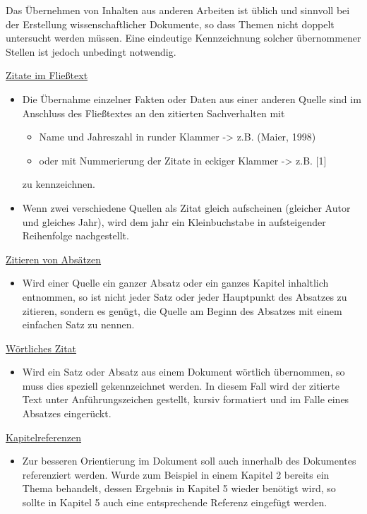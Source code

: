 Das Übernehmen von Inhalten aus anderen Arbeiten ist üblich und sinnvoll bei der Erstellung wissenschaftlicher Dokumente, so dass Themen nicht doppelt untersucht werden müssen. Eine eindeutige Kennzeichnung solcher übernommener Stellen ist jedoch unbedingt notwendig.

\underline{Zitate im Fließtext}
\begin{itemize}
    \item Die Übernahme einzelner Fakten oder Daten aus einer anderen Quelle sind im Anschluss des Fließtextes an den zitierten Sachverhalten mit
    \begin{itemize}
        \item Name und Jahreszahl in runder Klammer -> z.B. (Maier, 1998)
        \item oder mit Nummerierung der Zitate in eckiger Klammer -> z.B. [1]
    \end{itemize}
    zu kennzeichnen.
    \item Wenn zwei verschiedene Quellen als Zitat gleich aufscheinen (gleicher Autor und gleiches Jahr), wird dem jahr ein Kleinbuchstabe in aufsteigender Reihenfolge nachgestellt.
\end{itemize}


\underline{Zitieren von Absätzen}
\begin{itemize}
    \item Wird einer Quelle ein ganzer Absatz oder ein ganzes Kapitel inhaltlich entnommen, so ist nicht jeder Satz oder jeder Hauptpunkt des Absatzes zu zitieren, sondern es genügt, die Quelle am Beginn des Absatzes mit einem einfachen Satz zu nennen.
\end{itemize}


\underline{Wörtliches Zitat}
\begin{itemize}
    \item Wird ein Satz oder Absatz aus einem Dokument wörtlich übernommen, so muss dies speziell gekennzeichnet werden. In diesem Fall wird der zitierte Text unter Anführungszeichen gestellt, kursiv formatiert und im Falle eines Absatzes eingerückt.
\end{itemize}

\underline{Kapitelreferenzen}
\begin{itemize}
    \item Zur besseren Orientierung im Dokument soll auch innerhalb des Dokumentes referenziert werden. Wurde zum Beispiel in einem {\glqq}Kapitel 2{\grqq} bereits ein Thema behandelt, dessen Ergebnis in {\glqq}Kapitel 5{\grqq} wieder benötigt wird, so sollte in {\glqq}Kapitel 5{\grqq} auch eine entsprechende Referenz eingefügt werden.
\end{itemize}

